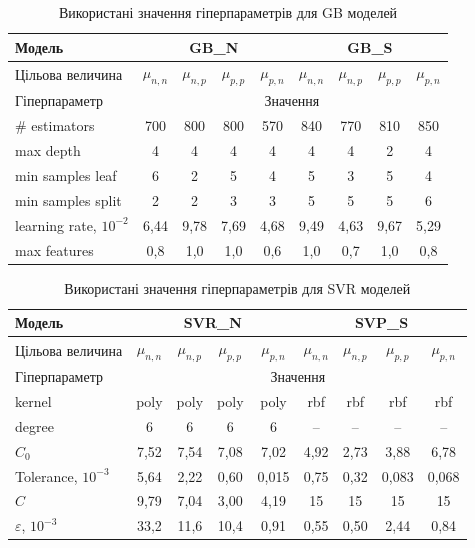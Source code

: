 \documentclass[14pt,a4paper,titlepage,oneside]{book}
\numberwithin{equation}{part}
\begin{document}
\begin{table}[!ht]
\setlength{\tabcolsep}{3pt}
\caption{Використані значення гіперпараметрів для GB моделей}
\label{tblGBrez}
\centering
\begin{tabular}{|l|c|c|c|c|c|c|c|c|}
\hline
Модель& \multicolumn{4}{c|}{GB\_N}& \multicolumn{4}{c|}{GB\_S} \rule{0pt}{11pt}\\
\hline
Цільова величина&$\mu_{n,n}$&$\mu_{n,p}$&$\mu_{p,p}$&$\mu_{p,n}$&$\mu_{n,n}$&$\mu_{n,p}$&$\mu_{p,p}$&$\mu_{p,n}$\\
\hline
Гіперпараметр&\multicolumn{8}{c|}{Значення}\\
\hline
\# estimators&700&800&800&570&840&770&810&850\\
\hline
max depth&4&4&4&4&4&4&2&4\\
\hline
min samples leaf &6&2&5&4&5&3&5&4\\
\hline
min samples split	&2&2&3&3&5&5&5&6\\
\hline
learning rate, $10^{-2}$	&6,44&9,78&7,69&4,68&9,49&4,63&9,67&5,29\\
\hline
max features &0,8&1,0&1,0&0,6&1,0&0,7&1,0&0,8\\
\hline
\end{tabular}
\end{table}

\begin{table}[!ht]
\setlength{\tabcolsep}{3pt}
\caption{Використані значення гіперпараметрів для SVR моделей}
\label{tblSVRrez}
\centering
\begin{tabular}{|l|c|c|c|c|c|c|c|c|}
\hline
Модель& \multicolumn{4}{c|}{SVR\_N}& \multicolumn{4}{c|}{SVP\_S} \rule{0pt}{11pt}\\
\hline
Цільова величина&$\mu_{n,n}$&$\mu_{n,p}$&$\mu_{p,p}$&$\mu_{p,n}$&$\mu_{n,n}$&$\mu_{n,p}$&$\mu_{p,p}$&$\mu_{p,n}$\\
\hline
Гіперпараметр&\multicolumn{8}{c|}{Значення}\\
\hline
kernel &poly&poly&poly&poly&rbf&rbf&rbf&rbf\\
\hline
degree&6&6&6&6&--&--&--&--\\
\hline
$C_0$ &7,52&7,54&7,08&7,02&4,92&2,73&3,88&6,78\\
\hline
Tolerance, $10^{-3}$&5,64&2,22&0,60&0,015&0,75&0,32&0,083&0,068\\
\hline
$C$	&9,79&7,04&3,00&4,19&15&15&15&15\\
\hline
$\varepsilon$, $10^{-3}$ &33,2&11,6&10,4&0,91&0,55&0,50&2,44&0,84\\
\hline
\end{tabular}
\end{table}
\end{document}
